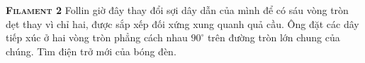 
\begin{problem}{\textbf{\textsc{Filament 2}}\hspace{1mm}}
	Follin giờ đây thay đổi sợi dây dẫn của mình để có sáu vòng tròn dẹt thay vì chỉ hai, được sắp xếp đối xứng xung quanh quả cầu. Ông đặt các dây tiếp xúc ở hai vòng tròn phẳng cách nhau $90^\circ$ trên đường tròn lớn chung của chúng. Tìm điện trở mới của bóng đèn.   
\end{problem}